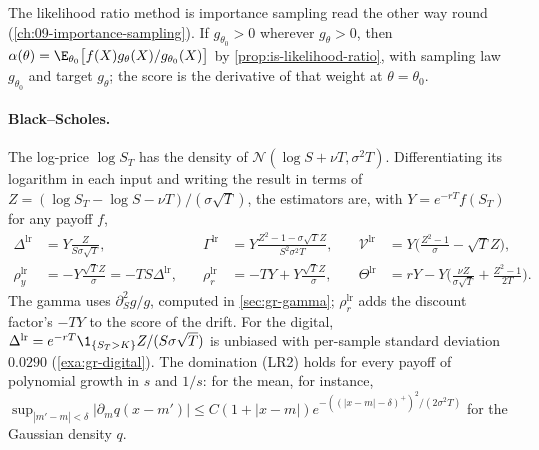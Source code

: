 The likelihood ratio method is importance sampling read the other way round
(\cref{ch:09-importance-sampling}). If $g_{\theta_0}>0$ wherever $g_\theta>0$, then
$\alpha(\theta)=\E_{\theta_0}\big[f(X)g_\theta(X)/g_{\theta_0}(X)\big]$ by
\cref{prop:is-likelihood-ratio}, with sampling law $g_{\theta_0}$ and target $g_\theta$; the
score is the derivative of that weight at $\theta=\theta_0$.

\paragraph{Black--Scholes.} The log-price $\log S_T$ has the density of
$\mathcal N(\log S+\nu T,\sigma^2T)$. Differentiating its logarithm in each input and writing
the result in terms of $Z=(\log S_T-\log S-\nu T)/(\sigma\sqrt T)$, the estimators are, with
$Y=e^{-rT}f(S_T)$ for any payoff $f$,
\begin{equation}\label{eq:gr-lr-bs}
\begin{aligned}
  \Delta^{\mathrm{lr}}&=Y\frac{Z}{S\sigma\sqrt T}, &\quad
  \Gamma^{\mathrm{lr}}&=Y\frac{Z^2-1-\sigma\sqrt TZ}{S^2\sigma^2T}, &\quad
  \mathcal V^{\mathrm{lr}}&=Y\Big(\frac{Z^2-1}{\sigma}-\sqrt TZ\Big),\\
  \rho_y^{\mathrm{lr}}&=-Y\frac{\sqrt TZ}{\sigma}=-TS\Delta^{\mathrm{lr}}, &\quad
  \rho_r^{\mathrm{lr}}&=-TY+Y\frac{\sqrt TZ}{\sigma}, &\quad
  \Theta^{\mathrm{lr}}&=rY-Y\Big(\frac{\nu Z}{\sigma\sqrt T}+\frac{Z^2-1}{2T}\Big).
\end{aligned}
\end{equation}
The gamma uses $\partial_S^2g/g$, computed in \cref{sec:gr-gamma}; $\rho_r^{\mathrm{lr}}$ adds the
discount factor's $-TY$ to the score of the drift. For the digital,
$\Delta^{\mathrm{lr}}=e^{-rT}\1_{\{S_T>K\}}Z/(S\sigma\sqrt T)$ is unbiased with per-sample
standard deviation $0.0290$ (\cref{exa:gr-digital}). The domination (LR2) holds for every
payoff of polynomial growth in $s$ and $1/s$: for the mean, for instance,
$\sup_{|m'-m|<\delta}|\partial_mq(x-m')|\le C(1+|x-m|)e^{-((|x-m|-\delta)^+)^2/(2\sigma^2T)}$ for
the Gaussian density $q$.


